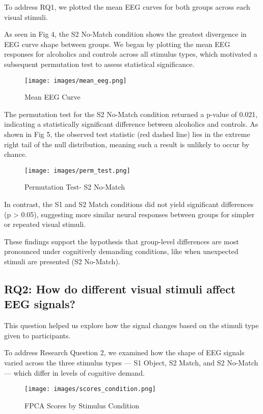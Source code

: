 \documentclass{article}
\begin{document}
To address RQ1, we plotted the mean EEG curves for both groups across
each visual stimuli.

As seen in Fig 4, the S2 No-Match condition shows the greatest
divergence in EEG curve shape between groups. We began by plotting the
mean EEG responses for alcoholics and controls across all stimulus
types, which motivated a subsequent permutation test to assess
statistical significance.

\begin{figure}[H]
\centering
\texttt{[image: images/mean\_eeg.png]}
\caption{Mean EEG Curve}
\end{figure}

The permutation test for the S2 No-Match condition returned a p-value of
0.021, indicating a statistically significant difference between
alcoholics and controls. As shown in Fig 5, the observed test statistic
(red dashed line) lies in the extreme right tail of the null
distribution, meaning such a result is unlikely to occur by chance.

\begin{figure}[H]
\centering
\texttt{[image: images/perm\_test.png]}
\caption{Permutation Test- S2 No-Match}
\end{figure}

In contrast, the S1 and S2 Match conditions did not yield significant
differences (p \textgreater{} 0.05), suggesting more similar neural
responses between groups for simpler or repeated visual stimuli.

These findings support the hypothesis that group-level differences are
most pronounced under cognitively demanding conditions, like when
unexpected stimuli are presented (S2 No-Match).

\subsection{RQ2: How do different visual stimuli affect EEG
signals?}\label{rq2-how-do-different-visual-stimuli-affect-eeg-signals}

This question helped us explore how the signal changes based on the
stimuli type given to participants.

To address Research Question 2, we examined how the shape of EEG signals
varied across the three stimulus types --- S1 Object, S2 Match, and S2
No-Match --- which differ in levels of cognitive demand.

\begin{figure}[H]
\centering
\texttt{[image: images/scores\_condition.png]}
\caption{FPCA Scores by Stimulus Condition}
\end{figure}
\end{document}
